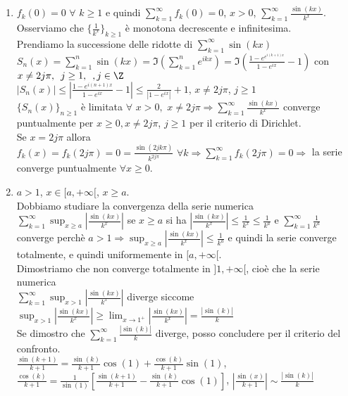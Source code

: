 \begin{exbar}
\begin{example}
	\begin{enumerate}
		\item $f_k(0)=0\,\, \forall\,\, k \geq 1 $ e quindi $\sum_{k=1}^{\infty} f_k(0)=0$, $x >0$, $\sum_{k=1}^{\infty} \frac{\sin(kx)}{k^x}$.\\
		Osserviamo che $\{\frac{1}{k^x}\}_{k \geq 1}$ è monotona decrescente e infinitesima.\\
		Prendiamo la successione delle ridotte di $\sum_{k=1}^{\infty}\sin(kx)$\\
		$S_n(x)=\sum_{k=1}^{n}\sin(kx)= \Im \left(\sum_{k=1}^{n}e^{ikx}\right)=\Im \left( \frac{1-e^{e^{i(k+1)x}}}{1-e^{ix}}-1\right) $ con $x \neq 2j\pi,\,\,\, j \geq 1, \,\,\, , j \in \Z$\\
		$|S_n(x)|\leq |\frac{1-e^{i(n+1)x}}{1-e^{ix}}-1|\leq \frac{2}{|1-e^{ix}|}+1$, $x \neq 2j\pi$, $j \geq 1$\\
		$\{S_n(x)\}_{n \geq 1}$ è limitata $\forall\,\, x >0,\,\, x \neq 2j\pi \Rightarrow \sum_{k=1}^{\infty}\frac{\sin(kx)}{k^x}$ converge puntualmente per $x \geq 0, x \neq 2j\pi$, $j \geq 1$ per il criterio di Dirichlet.\\
		Se $x = 2j \pi$ allora $f_k(x)=f_k(2j\pi)=0 = \frac{\sin(2jk\pi)}{k^{2j\pi}} \,\, \forall k \Rightarrow \sum_{k=1}^{\infty} f_k(2j\pi)=0\Rightarrow$ la serie converge puntualmente $\forall x \geq 0$.
		\item $a > 1$, $x \in [a,+\infty[$, $x\geq a $.\\
		Dobbiamo studiare la convergenza della serie numerica $\sum_{k=1}^{\infty}\sup_{x \geq a}|\frac{\sin(kx)}{k^x}|$ se $x \geq a$ si ha $|\frac{\sin(kx)}{k^x}|\leq \frac{1}{k^x}\leq \frac{1}{k^a}$ e $\sum_{k=1}^{\infty}\frac{1}{k^a}$ converge perchè $a > 1 \Rightarrow \sup_{x \geq a}|\frac{\sin(kx)}{k^x}| \leq \frac{1}{k^a}$ e quindi la serie converge totalmente, e quindi uniformemente in $[a,+\infty[$.\\
		Dimostriamo che non converge totalmente in $]1,+\infty[$, cioè che la serie numerica \\$\sum_{k=1}^{\infty}\sup_{x >1}|\frac{\sin(kx)}{k^x}| $
		diverge siccome $\sup_{x >1}|\frac{\sin(kx)}{k^x}|\geq \lim_{x \rightarrow 1^+}|\frac{\sin(kx)}{k^x}|=\frac{|\sin (k)|}{k}$\\
		Se dimostro che $\sum_{k=1}^{\infty}\frac{|\sin(k)|}{k}$ diverge, posso concludere per il criterio del confronto.\\
		$\frac{\sin(k+1)}{k+1}=\frac{\sin (k)}{k+1}\cos (1) +\frac{\cos(k)}{k+1}\sin(1)$, $\frac{\cos(k)}{k+1}=\frac{1}{\sin(1)}\left[\frac{\sin(k+1)}{k+1} -\frac{\sin(k)}{k+1} \cos(1) \right]$, $|\frac{\sin(x)}{k+1}| \sim \frac{|\sin(k)|}{k}$\\

\end{enumerate}
\end{example}
\end{exbar}
